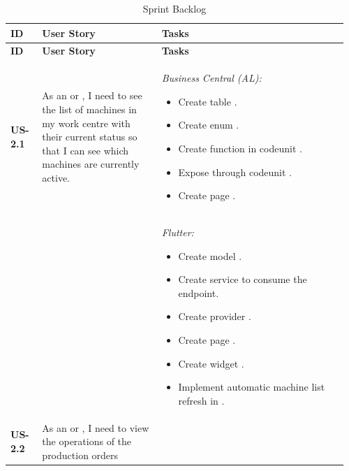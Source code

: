 \begin{longtable}{@{} P{0.09\linewidth} P{0.34\linewidth} P{0.53\linewidth} @{}}
  \caption{Sprint Backlog}
  \label{tab:s2-sprint-backlog}\\
  \toprule
  \textbf{ID} & \textbf{User Story} & \textbf{Tasks} \\
  \midrule
  \endfirsthead
  \toprule
  \textbf{ID} & \textbf{User Story} & \textbf{Tasks} \\
  \midrule
  \endhead
 
  \bottomrule
  \endlastfoot
  
  \textbf{US-2.1}
  & As an  or , I need to see the list
  of machines in my work centre with their current status so that I can see
  which machines are currently active.
  & \noindent\textit{Business Central (AL):}
  \begin{itemize}[nosep, leftmargin=*]
  \item Create table .
  \item Create enum .
  \item Create function  in codeunit .
  \item Expose  through codeunit .
  \item Create page .
  \end{itemize}
  \\ & &
  \noindent\textit{Flutter:}
  \begin{itemize}[nosep, leftmargin=*]
  \item Create model .
  \item Create service  to consume the  endpoint.
  \item Create provider .
  \item Create page .
  \item Create widget .
  \item Implement automatic machine list refresh in .
  \end{itemize}\\
  \midrule
  \textbf{US-2.2}
  & As an  or , I need to view the operations of the production orders

\end{longtable}

